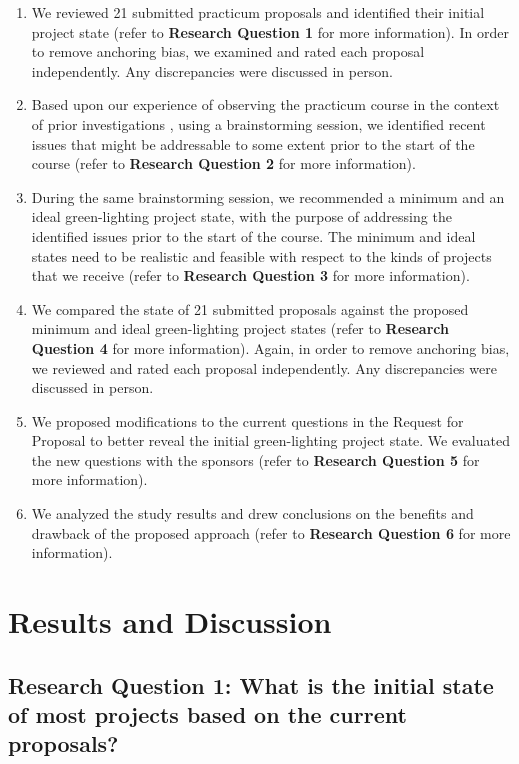 \documentclass[conference]{IEEEtran}
\begin{document}
\begin{enumerate}
\itemsep1pt\parskip0pt
\item
  We reviewed 21 submitted practicum proposals and
  identified their initial project state (refer to \textbf{Research Question
  1} for more information). In order to remove anchoring bias, we examined
  and rated each proposal independently. Any discrepancies were
  discussed in person.
\item
  Based upon our experience of observing the practicum course in the
  context of prior investigations \cite{EASE2014, ICSE2014},
  using a brainstorming session, we identified recent issues that
  might be addressable to some extent prior to the start of the course (refer to
  \textbf{Research Question 2} for more information).
\item
  During the same brainstorming session, we recommended a minimum and
  an ideal green-lighting project state, with the purpose of addressing
  the identified issues prior to the start of the course. The minimum
  and ideal states need to be realistic and feasible with respect to the
  kinds of projects that we receive (refer to \textbf{Research Question
  3} for more information).
\item
  We compared the state of 21 submitted proposals against the proposed
  minimum and ideal green-lighting project states (refer to \textbf{Research
  Question 4} for more information). Again, in order to remove
  anchoring bias, we reviewed and rated each proposal independently. Any
  discrepancies were discussed in person.
\item
  We proposed modifications to the current questions in the Request for
  Proposal to better reveal the initial green-lighting project state. We
  evaluated the new questions with the sponsors (refer to \textbf{Research
  Question 5} for more information).
\item
  We analyzed the study results and drew conclusions on the benefits
  and drawback of the proposed approach (refer to \textbf{Research Question 6
  } for more information).
\end{enumerate}

\section{Results and Discussion}
\label{Results}

\subsection{Research Question 1: What is the initial
state of most projects based on the current proposals?}
\end{document}

